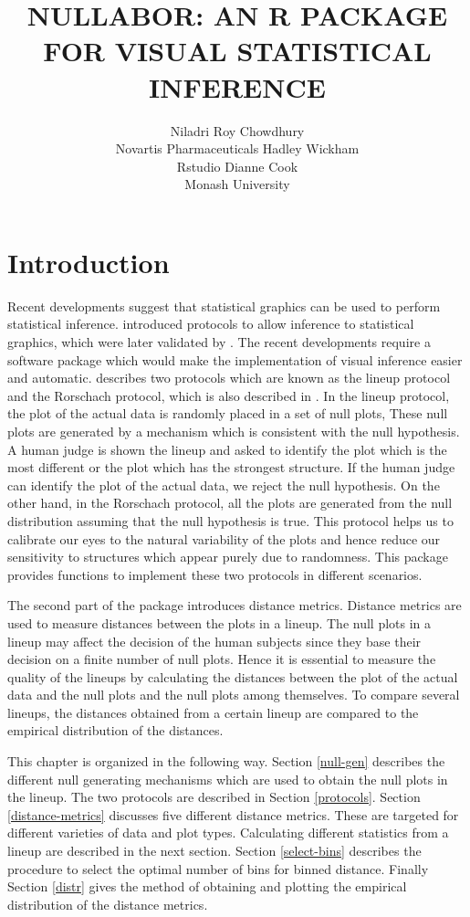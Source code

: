 \documentclass[article]{jss}
\author{Niladri Roy Chowdhury\\Novartis Pharmaceuticals \And 
        Hadley Wickham\\Rstudio \And
        Dianne Cook\\Monash University}
\title{NULLABOR: AN R PACKAGE FOR VISUAL STATISTICAL INFERENCE}
\begin{document}

\section{Introduction}\label{introduction}

Recent developments suggest that statistical graphics can be used to perform statistical inference. \cite{buja:2009} introduced protocols to allow inference to statistical graphics, which were later validated by \cite{majumder:2013}. The recent developments require a software package which would make the implementation of visual inference easier and automatic. \cite{buja:2009} describes two protocols which are known as the lineup protocol and the Rorschach protocol, which is also described in \cite{hadley:2010}. In the lineup protocol, the plot of the actual data is randomly placed in a set of null plots, These null plots are generated by a mechanism which is consistent with the null hypothesis. A human judge is shown the lineup and asked to identify the plot which is the most different or the plot which has the strongest structure. If the human judge can identify the plot of the actual data, we reject the null hypothesis. On the other hand, in the Rorschach protocol, all the plots are generated from the null distribution assuming that the null hypothesis is true. This protocol helps us to calibrate our eyes to the natural variability of the plots and hence reduce our sensitivity to structures which appear purely due to randomness. This package provides functions to implement these two protocols in different scenarios. 

The second part of the package introduces distance metrics. Distance metrics are used to measure distances between the plots in a lineup.  The null plots in a lineup may affect the decision of the human subjects since they base their decision on a finite number of null plots. Hence it is essential to measure the quality of the lineups by calculating the distances between the plot of the actual data and the null plots and the null plots among themselves. To compare several lineups, the distances obtained from a certain lineup are compared to the empirical distribution of the distances. 

This chapter is organized in the following way. Section \ref{null-gen} describes the different null generating mechanisms which are used to obtain the null plots in the lineup. The two protocols are described in Section \ref{protocols}. Section \ref{distance-metrics} discusses five different distance metrics. These are targeted for different varieties of data and plot types. Calculating different statistics from a lineup are described in the next section. Section \ref{select-bins} describes the procedure to select the optimal number of bins for binned distance. Finally Section \ref{distr} gives the method of obtaining and plotting the empirical distribution of the distance metrics.
\end{document}

